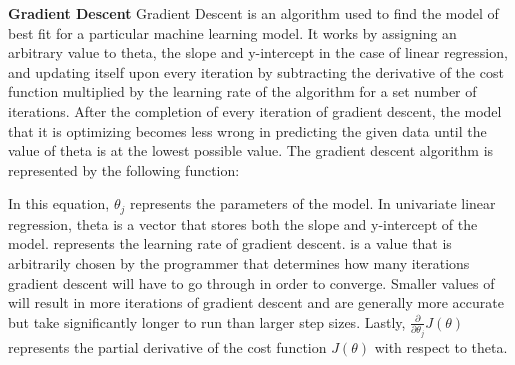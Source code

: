 \documentclass{article}
\begin{document}
\textbf{Gradient Descent}\newline
Gradient Descent is an algorithm used to find the model of best fit for a particular machine learning model. It works by assigning an arbitrary
value to theta, the slope and y-intercept in the case of linear regression, and updating itself upon every iteration by subtracting the derivative of the cost function multiplied by the learning rate of the algorithm for a set number of iterations. After the completion of every iteration of gradient descent, the model that it is optimizing becomes less wrong in predicting the given data until the value of theta is at the lowest possible value. The gradient descent algorithm is represented by the following function: \newline
  
        \newline
       In this equation, $\theta_j$ represents the parameters of the model. In univariate linear regression, theta is a vector that stores both the slope and y-intercept of the model. \scalebox{1.3}{$\alpha$} represents the learning rate of gradient descent. \scalebox{1.3}{$\alpha$} is a value that is arbitrarily chosen by the programmer that determines how many iterations gradient descent will have to go through in order to converge. Smaller values of  \scalebox{1.3}{$\alpha$} will result in more iterations of gradient descent and are generally more accurate but take significantly longer to run than larger step sizes. Lastly, $ \frac{\partial}{\partial \theta_{j}}   J(\theta) $ represents the partial derivative of the cost function $J(\theta)$ with respect to theta.

  
    
\end{document}
